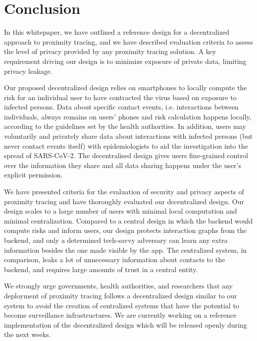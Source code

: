 \documentclass[12pt,a4paper]{article}
\begin{document}
\section*{Conclusion}
In this whitepaper, we have outlined a reference design for a decentralized approach to
proximity tracing, and we have described evaluation criteria to assess the level of privacy provided by any proximity tracing solution. A key requirement driving our design is to minimize exposure of private data, limiting privacy leakage.

Our proposed decentralized design relies on smartphones to locally compute the risk for an
individual user to have contracted the virus based on exposure to infected persons. Data
about specific contact events, i.e. interactions between individuals, always remains on users’ phones and risk calculation happens locally, according to the guidelines set by the health authorities. In addition, users may voluntarily and privately share data about interactions with infected persons (but never contact events itself) with epidemiologists to aid the investigation into the spread of SARS-CoV-2. The decentralised design gives users fine-grained control over the information they share and all data sharing happens under the user’s explicit permission.

We have presented criteria for the evaluation of security and privacy aspects of proximity
tracing and have thoroughly evaluated our decentralized design. Our design scales to a
large number of users with minimal local computation and minimal centralization. Compared
to a central design in which the backend would compute risks and inform users, our design
protects interaction graphs from the backend, and only a determined tech-savvy adversary
can learn any extra information besides the one made visible by the app. The centralized
system, in comparison, leaks a lot of unnecessary information about contacts to the
backend, and requires large amounts of trust in a central entity.

We strongly urge governments, health authorities, and researchers that any deployment of
proximity tracing follows a decentralized design similar to our system to avoid the creation of centralized systems that have the potential to become surveillance infrastructures. We are currently working on a reference implementation of the decentralized design which will be released openly during the next weeks.
\end{document}
